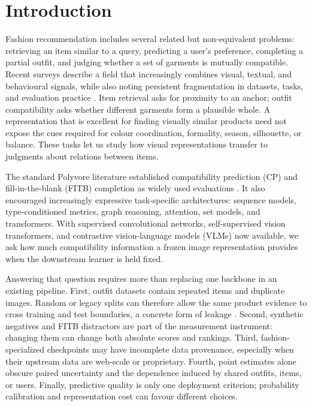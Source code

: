 \documentclass[preprint,12pt]{elsarticle}
\begin{document}
\section{Introduction}\label{sec:introduction}

Fashion recommendation includes several related but non-equivalent problems: retrieving an item similar to a query, predicting a user's preference, completing a partial outfit, and judging whether a set of garments is mutually compatible. Recent surveys describe a field that increasingly combines visual, textual, and behavioural signals, while also noting persistent fragmentation in datasets, tasks, and evaluation practice \cite{ding2024fashion,deldjoo2024review}. Item retrieval asks for proximity to an anchor; outfit compatibility asks whether different garments form a plausible whole. A representation that is excellent for finding visually similar products need not expose the cues required for colour coordination, formality, season, silhouette, or balance. These tasks let us study how visual representations transfer to judgments about relations between items.

The standard Polyvore literature established compatibility prediction (CP) and fill-in-the-blank (FITB) completion as widely used evaluations \cite{han2017bilstm,vasileva2018typeaware,cucurull2019context}. It also encouraged increasingly expressive task-specific architectures: sequence models, type-conditioned metrics, graph reasoning, attention, set models, and transformers. With supervised convolutional networks, self-supervised vision transformers, and contrastive vision-language models (VLMs) now available, we ask how much compatibility information a frozen image representation provides when the downstream learner is held fixed.

Answering that question requires more than replacing one backbone in an existing pipeline. First, outfit datasets contain repeated items and duplicate images. Random or legacy splits can therefore allow the same product evidence to cross training and test boundaries, a concrete form of leakage \cite{kaufman2011leakage,kapoor2023leakage}. Second, synthetic negatives and FITB distractors are part of the measurement instrument: changing them can change both absolute scores and rankings. Third, fashion-specialized checkpoints may have incomplete data provenance, especially when their upstream data are web-scale or proprietary. Fourth, point estimates alone obscure paired uncertainty and the dependence induced by shared outfits, items, or users. Finally, predictive quality is only one deployment criterion; probability calibration and representation cost can favour different choices.
\end{document}
